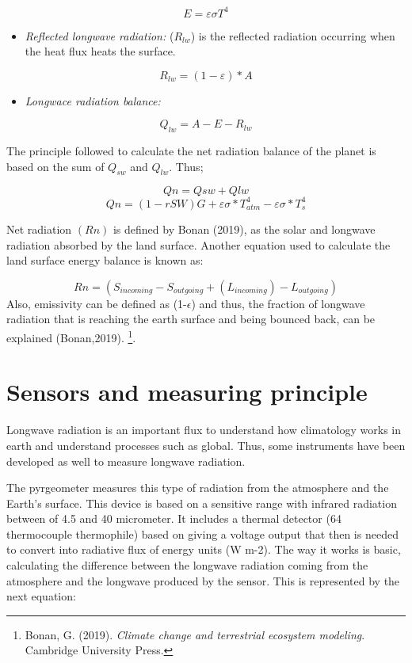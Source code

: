 \documentclass[
]{article}
\providecommand{\tightlist}{%
  \setlength{\itemsep}{0pt}\setlength{\parskip}{0pt}}
\begin{document}
\[E = \varepsilon \sigma T^4\]

\begin{itemize}
\tightlist
\item
  \emph{Reflected longwave radiation:} (\(R_{lw}\)) is the reflected
  radiation occurring when the heat flux heats the surface.
\end{itemize}

\[R_{lw} = (1-\varepsilon)*A\]

\begin{itemize}
\tightlist
\item
  \emph{Longwace radiation balance:}
\end{itemize}

\[Q_{lw} =  A-E-R_{lw}\]

The principle followed to calculate the net radiation balance of the
planet is based on the sum of \(Q_{sw}\) and \(Q_{lw}\). Thus;

\[Qn = Qsw + Qlw\]
\[Qn=(1-rSW) G + \varepsilon \sigma *T_{atm}^4 - \varepsilon \sigma *T_s^4\]

Net radiation \((Rn)\) is defined by Bonan (2019), as the solar and
longwave radiation absorbed by the land surface. Another equation used
to calculate the land surface energy balance is known as:

\[Rn = (S_{incoming} - S_{outgoing}+(L_{incoming}) - L_{outgoing})\]
Also, emissivity can be defined as (1-\(\epsilon\)) and thus, the
fraction of longwave radiation that is reaching the earth surface and
being bounced back, can be explained (Bonan,2019). \footnote{Bonan, G.
  (2019). \emph{Climate change and terrestrial ecosystem modeling}.
  Cambridge University Press.}.

\hypertarget{sensors-and-measuring-principle}{%
\section{Sensors and measuring
principle}\label{sensors-and-measuring-principle}}

Longwave radiation is an important flux to understand how climatology
works in earth and understand processes such as global. Thus, some
instruments have been developed as well to measure longwave radiation.

The pyrgeometer measures this type of radiation from the atmosphere and
the Earth's surface. This device is based on a sensitive range with
infrared radiation between of 4.5 and 40 micrometer. It includes a
thermal detector (64 thermocouple thermophile) based on giving a voltage
output that then is needed to convert into radiative flux of energy
units (W m-2). The way it works is basic, calculating the difference
between the longwave radiation coming from the atmosphere and the
longwave produced by the sensor. This is represented by the next
equation:
\end{document}
